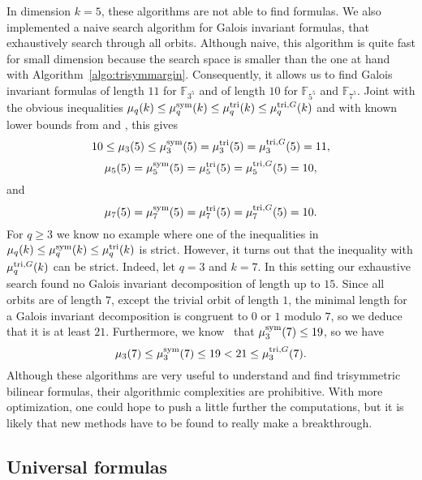 In dimension $k=5$, these algorithms are not able to find formulas.
We also implemented a naive search algorithm for Galois invariant formulas, that
exhaustively search through all orbits. Although naive, this algorithm is quite
fast for small dimension because the search space is smaller than the one at
hand with Algorithm~\ref{algo:trisymmargin}. Consequently, it allows
us to find Galois invariant formulas of length $11$ for $\mathbb{F}_{3^5}$ and
of length $10$ for $\mathbb{F}_{5^5}$ and $\mathbb{F}_{7^5}$.
Joint with the obvious inequalities
$\mu_q(k)\leq\mu^{\textrm{sym}}_q(k)\leq\mu^{\textrm{tri}}_q(k)\leq\mu^{\textrm{tri},G}_q(k)$ and with known lower
bounds from \cite[Thm. 2.2]{BCPRRR19} and \cite{BDEZ12},
this gives 
\[
  10\leq\mu_3(5)\leq\mu^{\textrm{sym}}_3(5)=\mu^{\textrm{tri}}_3(5)=\mu^{\textrm{tri},G}_3(5)=11,
\]
\[
\mu_5(5)=\mu^{\textrm{sym}}_5(5)=\mu^{\textrm{tri}}_5(5)=\mu^{\textrm{tri},G}_5(5)=10,
\]
and 
\[
  \mu_7(5)=\mu^{\textrm{sym}}_7(5)=\mu^{\textrm{tri}}_7(5)=\mu^{\textrm{tri},G}_7(5)=10.
\]
For $q\geq3$ we know no example where one of the inequalities in
$\mu_q(k)\leq\mu^{\textrm{sym}}_q(k)\leq\mu^{\textrm{tri}}_q(k)$ is strict. However, it turns out that
the inequality with $\mu^{\textrm{tri},G}_q(k)$ can be strict. Indeed, let $q=3$ and $k=7$.
In this setting our exhaustive search found no Galois invariant decomposition of
length up to $15$. Since all orbits are of length $7$, except the trivial orbit
of length $1$, the minimal length for a Galois invariant decomposition is congruent
to $0$ or $1$ modulo $7$, so we deduce that it is at least $21$. Furthermore, we
know~\cite[Table~2]{BCPRRR19} that $\mu^{\textrm{sym}}_3(7)\leq19$, so we have
\[
  \mu_3(7)\leq\mu^{\textrm{sym}}_3(7)\leq 19<21\leq \mu^{\textrm{tri},G}_3(7).
\]
Although these algorithms are very useful to understand and find trisymmetric
bilinear formulas, their algorithmic complexities are prohibitive. With more
optimization, one could hope to push a little further the computations, but it
is likely that new methods have to be found to really make a breakthrough.

\subsection{Universal formulas}

